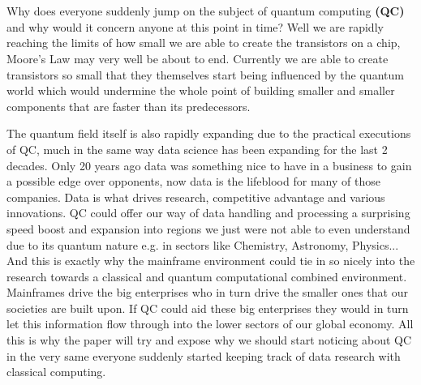 
\chapter{}
\label{ch:inleiding}

Why does everyone suddenly jump on the subject of quantum computing \textbf{(QC)} and why would it concern anyone at this point in time? Well we are rapidly reaching the limits of how small we are able to create the transistors on a chip, Moore's Law may very well be about to end. Currently we are able to create transistors so small that they themselves start being influenced by the quantum world which would undermine the whole point of building smaller and smaller components that are faster than its predecessors. \autocite{Hartnett2019}

The quantum field itself is also rapidly expanding due to the practical executions of QC, much in the same way data science has been expanding for the last 2 decades. Only 20 years ago data was something nice to have in a business to gain a possible edge over opponents, now data is the lifeblood for many of those companies. Data is what drives research, competitive advantage and various innovations. QC could offer our way of data handling and processing a surprising speed boost and expansion into regions we just were not able to even understand due to its quantum nature e.g. in sectors like Chemistry, Astronomy, Physics...  And this is exactly why the mainframe environment could tie in so nicely into the research towards a classical and quantum computational combined environment. Mainframes drive the big enterprises who in turn drive the smaller ones that our societies are built upon. If QC could aid these big enterprises they would in turn let this information flow through into the lower sectors of our global economy. All this is why the paper will try and expose why we should start noticing about QC in the very same everyone suddenly started keeping track of data research with classical computing.~\autocite{Google2019} ~\autocite{IBM2019}


\section{}
\label{sec:probleemstelling}

